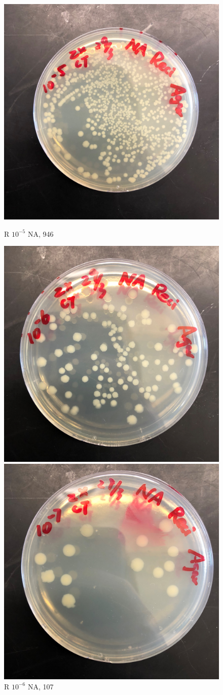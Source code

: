 \documentclass{article}
\begin{document}
			\begin{figure}[H]
				\begin{minipage}[t]{0.32\textwidth}
					\centering
					\includegraphics[width = 0.675\linewidth]{Reci_5_NA.jpg}
					\caption{R $10 ^ {-5} $ NA, 946}
				\end{minipage}
				\begin{minipage}[t]{0.32\textwidth}
					\centering
					\includegraphics[width = 0.675\linewidth]{Reci_6_NA.jpg}
					\caption{R $10 ^{-6} $ NA, 107}
				\end{minipage}
				\begin{minipage}[t]{0.32\textwidth}
					\centering
					\includegraphics[width = 0.675\linewidth]{Reci_7_NA.jpg}

\end{minipage}
\end{figure}
\end{document}
